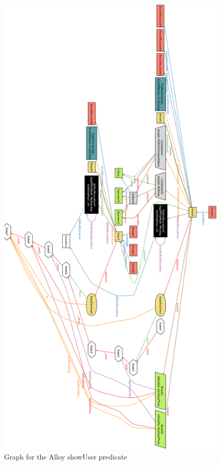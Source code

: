 \begin{figure}
	\vspace*{-0.5cm}
	\centering\includegraphics[height=\textheight]{Images/AlloyShowUser.png}
	\caption{Graph for the Alloy showUser predicate}
\end{figure}

